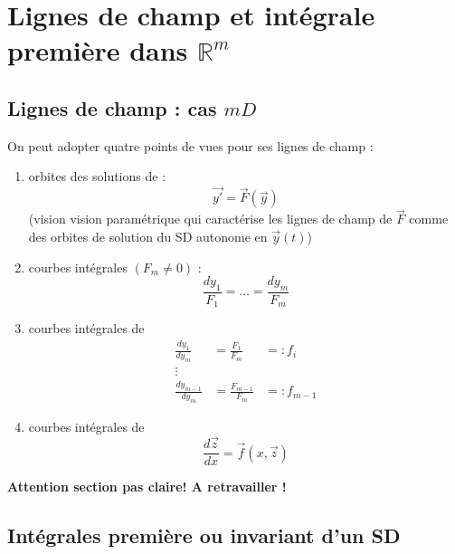 \section{Lignes de champ et intégrale première dans $\mathbb{R}^m$}
	\setcounter{subsection}{2}
	\subsection{Lignes de champ : cas $mD$}
	On peut adopter quatre points de vues  pour ses lignes de champ :
	\begin{enumerate}
	\item orbites des solutions de :
	\begin{equation}
	\vec{y'} = \vec{F}(\vec{y})
	\end{equation}
	(vision vision paramétrique qui caractérise les lignes de champ de $\vec{F}$ 
	comme des orbites de solution du SD autonome en $\vec{y}(t)$)
	\item courbes intégrales $(F_m\neq0)$ :
	\begin{equation}
	\frac{dy_1}{F_1}=\dots=\frac{dy_m}{F_m}
	\end{equation}
	\item courbes intégrales de 
	\begin{equation}
	\begin{array}{lll}
	\frac{dy_1}{dy_m} &= \frac{F_1}{F_m} &=: f_i\\
	\vdots\\
	\frac{dy_{m-1}}{dy_m} &= \frac{F_{m-1}}{F_m} &=: f_{m-1}
	\end{array}
	\end{equation}
	\item courbes intégrales de 
	\begin{equation}
	\frac{d\vec{z}}{dx} = \vec{f}(x,\vec{z})
	\end{equation}
	\end{enumerate}
	\textbf{Attention section pas claire! A retravailler !}
	
	\subsection{Intégrales première ou invariant d'un SD}
	\ 
	
